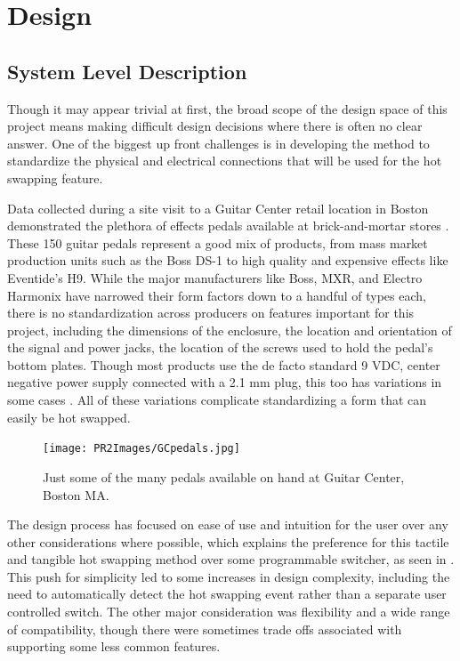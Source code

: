 \documentclass{article}
\begin{document}
\newpage
\section{Design}
	\subsection{System Level Description}

	Though it may appear trivial at first, the broad scope of the design space of this project means making difficult design decisions where there is often no clear answer.  One of the biggest up front challenges is in developing the method to standardize the physical and electrical connections that will be used for the hot swapping feature.  

	Data collected during a site visit to a Guitar Center retail location in Boston demonstrated the plethora of effects pedals available at brick-and-mortar stores \cite{MyPedalData}.  These 150 guitar pedals represent a good mix of products, from mass market production units such as the Boss DS-1 to high quality and expensive effects like Eventide's H9.  While the major manufacturers like Boss, MXR, and Electro Harmonix have narrowed their form factors down to a handful of types each, there is no standardization across producers on features important for this project, including the dimensions of the enclosure, the location and orientation of the signal and power jacks, the location of the screws used to hold the pedal's bottom plates.  Though most products use the de facto standard 9 VDC, center negative power supply connected with a 2.1 mm plug, this too has variations in some cases \cite{MyPedalData}.  All of these variations complicate standardizing a form that can easily be hot swapped.

	\begin{figure}
		\centering
		\texttt{[image: PR2Images/GCpedals.jpg]}
		\caption{Just some of the many pedals available on hand at Guitar Center, Boston MA.}
		\label{fig:GCpedalscase}
	\end{figure}

	The design process has focused on ease of use and intuition for the user over any other considerations where possible, which explains the preference for this tactile and tangible hot swapping method over some programmable switcher, as seen in \cite{ProgrammableSwitcherExample}.  This push for simplicity led to some increases in design complexity, including the need to automatically detect the hot swapping event rather than a separate user controlled switch.  The other major consideration was flexibility and a wide range of compatibility, though there were sometimes trade offs associated with supporting some less common features.
\end{document}
